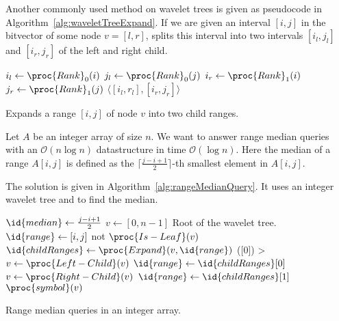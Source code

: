 Another commonly used method on wavelet trees is  given as pseudocode in Algorithm~\ref{alg:waveletTreeExpand}. If we are given an interval $[i,j]$ in the bitvector of some node $v=[l,r]$,  splits this interval into two intervals $[i_l,j_l]$ and $[i_r,j_r]$ of the left and right child.

\begin{algorithm}[htb]
  \begin{codebox}
    \li $i_l \gets \proc{Rank}_0(i)$
    \li $j_l \gets \proc{Rank}_0(j)$
    \li $i_r \gets \proc{Rank}_1(i)$
    \li $j_r \gets \proc{Rank}_1(j)$
    \li \Return $\langle [i_l,r_l], [i_r,j_r] \rangle$
  \end{codebox}
  \caption{Expands a range $[i,j]$ of node $v$ into two child ranges.}
  \label{alg:waveletTreeExpand}
\end{algorithm}

\begin{Example}
  \label{exp:rangeMedianQueries}
  Let $A$ be an integer array of size $n$. We want to answer range median queries with an $\mathcal{O}(n\log n)$ datastructure in time $\mathcal{O}(\log n)$. Here the median of a range $A[i,j]$ is defined as the $\lceil \frac{j - i + 1}{2} \rceil$-th smallest element in $A[i,j]$.

  The solution is given in Algorithm~\ref{alg:rangeMedianQuery}. It uses an integer wavelet tree and  to find the median.
  \begin{algorithm}[htb]
    \begin{codebox}
      \li $\id{median} \gets \frac{j - i + 1}{2}$
      \li $v \gets [0,n-1]$ \>\>\>\>\>\>\>\>\Comment Root of the wavelet tree.
      \li $\id{range} \gets [i,j]$
      \li \While not $\proc{Is-Leaf}(v)$
          \Do
      \li   $\id{childRanges} \gets \proc{Expand}(v, \id{range})$
      \li   \If {}([0]) > 
            \Then
      \li     $v \gets \proc{Left-Child}(v)$
      \li     $\id{range} \gets \id{childRanges}[0]$
      \li   \Else
      \li     $v \gets \proc{Right-Child}(v)$
      \li     $\id{range} \gets \id{childRanges}[1]$
            \End
          \End
      \li \Return $\proc{symbol}(v)$
    \end{codebox}
    \caption{Range median queries in an integer array.}
    \label{alg:rangeMedianQuery}
  \end{algorithm}
\end{Example}
